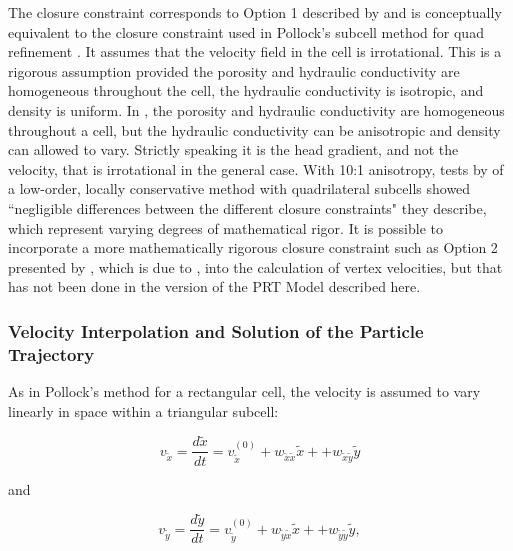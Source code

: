 The closure constraint corresponds to Option 1 described by \cite{zhang2012} and is conceptually equivalent to the closure constraint used in Pollock's subcell method for quad refinement \citep{pollock2015}. It assumes that the velocity field in the cell is irrotational. This is a rigorous assumption provided the porosity and hydraulic conductivity are homogeneous throughout the cell, the hydraulic conductivity is isotropic, and density is uniform. In \mf, the porosity and hydraulic conductivity are homogeneous throughout a cell, but the hydraulic conductivity can be anisotropic and density can allowed to vary. Strictly speaking it is the head gradient, and not the velocity, that is irrotational in the general case. With 10:1 anisotropy, tests by \cite{zhang2012} of a low-order, locally conservative method with quadrilateral subcells showed ``negligible differences between the different closure constraints" they describe, which represent varying degrees of mathematical rigor. It is possible to incorporate a more mathematically rigorous closure constraint such as Option 2 presented by \cite{zhang2012}, which is due to \cite{cordes1992}, into the calculation of vertex velocities, but that has not been done in the version of the PRT Model described here.

\subsubsection{Velocity Interpolation and Solution of the Particle Trajectory}

As in Pollock's method \citep{pollock2016modpath7} for a rectangular cell, the velocity is assumed to vary linearly in space within a triangular subcell:

\begin{equation}
v_{\tilde{x}} = \frac{d \tilde{x}}{dt} = v_{\tilde{x}}^{(0)} + w_{\tilde{x} \tilde{x}} \tilde{x} + + w_{\tilde{x} \tilde{y}} \tilde{y}
\label{eqn:vxlinear}
\end{equation}

\noindent and

\begin{equation}
v_{\tilde{y}} = \frac{d \tilde{y}}{dt} = v_{\tilde{y}}^{(0)} + w_{\tilde{y} \tilde{x}} \tilde{x} + + w_{\tilde{y} \tilde{y}} \tilde{y} ,
\label{eqn:vylinear}
\end{equation}

